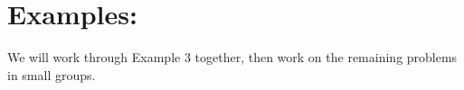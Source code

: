 %
%

\section*{Examples:}

We will work through Example 3 together, then work on the remaining problems in small groups.


